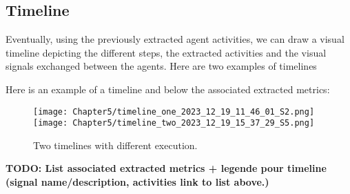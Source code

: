 \subsection{Timeline}

Eventually, using the previously extracted agent activities, we can draw a visual timeline depicting the different steps, the extracted activities and the visual signals exchanged between the agents. Here are two examples of timelines 

Here is an example of a timeline and below the associated extracted metrics:

\begin{figure}
    \centering
    \texttt{[image: Chapter5/timeline\_one\_2023\_12\_19\_11\_46\_01\_S2.png]}
    \texttt{[image: Chapter5/timeline\_two\_2023\_12\_19\_15\_37\_29\_S5.png]}
    \caption{Two timelines with different execution.}
    \label{fig:timeline_example}
\end{figure}


\textbf{TODO: List associated extracted metrics + legende pour timeline (signal name/description, activities link to list above.)}





